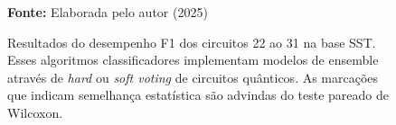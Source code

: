 \begin{figure}
\caption{Resultados do desempenho F1 dos circuitos 22 ao 31 na base \gls{SST}. Esses algoritmos classificadores implementam modelos de ensemble através de \textit{hard} ou \textit{soft voting} de circuitos quânticos. As marcações que indicam semelhança estatística são advindas do teste pareado de Wilcoxon.}
\label{fig:f1:sst:g7}
     \centering
    \centering

      \par\medskip\ABNTEXfontereduzida\selectfont\textbf{Fonte:} Elaborada pelo autor (2025) \par\medskip
\end{figure}